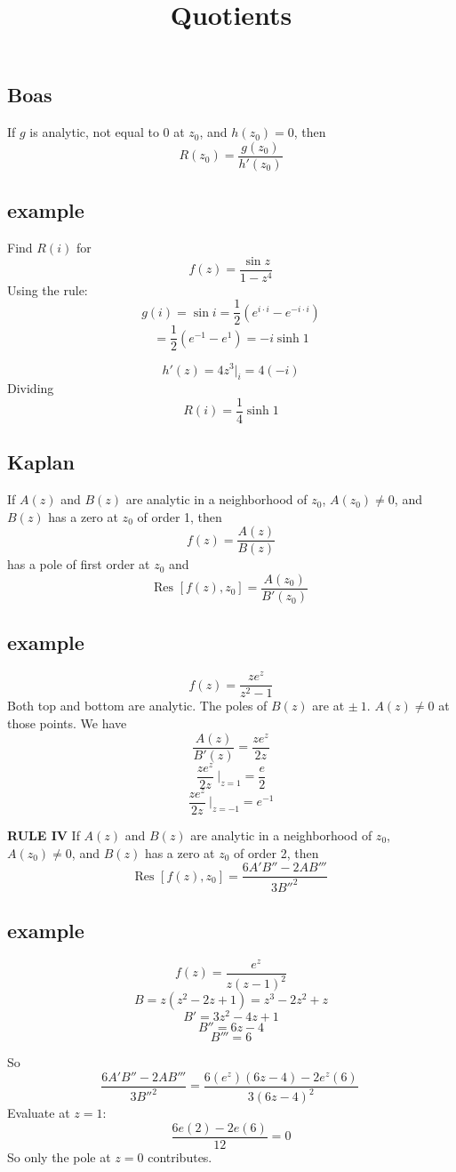 \documentclass[11pt, oneside]{article}
\title{Quotients}
\date{}
\begin{document}
\maketitle
\Large



\subsection*{Boas}

If $g$ is analytic, not equal to $0$ at $z_0$, and $h(z_0) = 0$, then
\[ R(z_0) = \frac{g(z_0)}{h'(z_0)} \]

\subsection*{example}

\label{sec:ex31R}

Find $R(i)$ for 
\[ f(z) = \frac{\sin z}{1 - z^4} \]
Using the rule:
\[ g(i) = \sin i = \frac{1}{2} (e^{i \cdot i} - e^{-i \cdot i}) \]
\[ = \frac{1}{2} (e^{-1} - e^{1}) = -i \sinh 1 \]

\[ h'(z) = 4z^3 \bigg |_i = 4(- i) \]
Dividing 
\[ R(i) = \frac{1}{4} \sinh 1 \]

\subsection*{Kaplan}

If $A(z)$ and $B(z)$ are analytic in a neighborhood of $z_0$, $A(z_0) \ne 0$, and $B(z)$ has a zero at $z_0$ of order 1, then
\[ f(z) = \frac{A(z)}{B(z)} \]
has a pole of first order at $z_0$ and
\[ \text{Res } [f(z),z_0] = \frac{A(z_0)}{B'(z_0)} \]

\subsection*{example}

\label{sec:ex27R}

\[ f(z) = \frac{z e^z}{z^2 - 1} \]
Both top and bottom are analytic.  The poles of $B(z)$ are at $\pm \ 1$.  $A(z) \ne 0$ at those points.  We have 
\[ \frac{A(z)}{B'(z)} = \frac{z e^z}{2z} \]
\[ \frac{z e^z}{2z} \ \bigg |_{z=1} = \frac{e}{2} \]
\[ \frac{z e^z}{2z} \ \bigg |_{z=-1} = e^{-1} \]

\textbf{RULE IV}  If $A(z)$ and $B(z)$ are analytic in a neighborhood of $z_0$, $A(z_0) \ne 0$, and $B(z)$ has a zero at $z_0$ of order 2, then
\[ \text{Res } [f(z),z_0] = \frac{6A' B'' - 2AB'''}{3B''^2} \]

\subsection*{example}

\label{sec:ex30R}

\[ f(z) = \frac{e^z}{z(z-1)^2} \]
\[ B = z(z^2 - 2z + 1) = z^3 - 2z^2 + z \]
\[ B' = 3z^2 - 4z + 1 \]
\[ B'' = 6z - 4 \]
\[ B''' = 6 \]

So
\[ \frac{6A' B'' - 2AB'''}{3B''^2} = \frac{6(e^z)(6z-4) - 2e^z(6)}{3(6z-4)^2} \ \]
Evaluate at $z=1$:
\[ \frac{6e(2) - 2e(6)}{12} = 0 \]
So only the pole at $z=0$ contributes.
\end{document}
